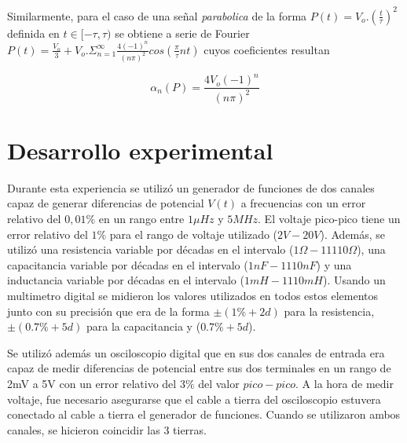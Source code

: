 \documentclass[11pt,a4paper]{article}
\begin{document}
Similarmente, para el caso de una señal \textit{parabolica} de la forma $P(t)=V_o.(\frac{t}{\tau})^2$ definida en $t\in[-\tau,\tau)$ se obtiene a serie de Fourier $P(t) = \frac{V_o}{3} + V_o.\Sigma_{n=1}^{\infty} \frac{4(-1)^n}{(n\pi)^2}cos(\frac{\pi}{\tau}nt)$ cuyos coeficientes resultan

\begin{equation}
\alpha_n(P) = \frac{4V_o(-1)^n}{(n\pi)^2}
\label{eq:coef_parab}
\end{equation}



\section{Desarrollo experimental}
Durante esta experiencia se utilizó un generador de funciones de dos canales capaz de generar diferencias de potencial $V(t)$ a frecuencias con un error relativo del $0,01\%$ en un rango entre $1\mu Hz$ y $5MHz$. El voltaje pico-pico tiene un error relativo del $1\%$ para el rango de voltaje utilizado ($2V-20V$). Además, se utilizó una resistencia variable por décadas en el intervalo ($1\Omega-11110\Omega$), una capacitancia variable por décadas en el intervalo ($1nF-1110nF$) y una inductancia variable por décadas en el intervalo ($1mH-1110mH$). Usando un multimetro digital se midieron los valores utilizados en todos estos elementos junto con su precisión que era de la forma $\pm(1\%+2d)$ para la resistencia, $\pm(0.7\%+5d)$ para la capacitancia y ($0.7\% +5d$).

Se utilizó además un osciloscopio digital que en sus dos canales de entrada era capaz de medir diferencias de potencial entre sus dos terminales en un rango de 2mV a 5V con un error relativo del $3\%$ del valor $pico-pico$. A la hora de medir voltaje, fue necesario asegurarse que el cable a tierra del osciloscopio estuvera conectado al cable a tierra el generador de funciones. Cuando se utilizaron ambos canales, se hicieron coincidir las 3 tierras.
\end{document}
